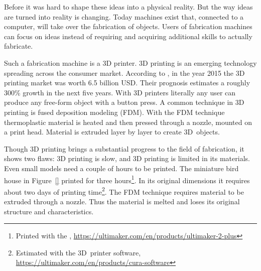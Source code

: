 \documentclass[../ClassicThesis.tex]{subfiles}
\begin{document}
Before it was hard to shape these ideas into a physical reality. But
the way ideas are turned into reality is changing. Today machines
exist that, connected to a computer, will take over the fabrication of
objects. Users of fabrication machines can focus on ideas
instead of requiring and acquiring additional skills to actually
fabricate.


Such a fabrication machine is a 3D printer. 3D printing is an emerging
technology spreading across the consumer market. According to
, in the year 2015 the 3D printing market was
worth 6.5 billion USD. Their prognosis estimates a roughly 300\%
growth in the next five years\cite{wohlers-market}. With 3D printers
literally any user can produce any free-form object with a button
press. A common technique in 3D printing is fused deposition modeling
(FDM)\cite{}. With the FDM technique
thermoplastic material is heated and then pressed through a nozzle,
mounted on a print head. Material is extruded layer by layer  to
create 3D~objects\cite{}.

Though 3D printing brings a substantial progress to the field of
fabrication, it shows two flaws: 3D printing is slow, and 3D printing
is limited in its materials. Even small models need a couple of hours
to be printed. The miniature bird house in Figure~\ref{}
printed for three hours\footnote{Printed with the ,
  \url{https://ultimaker.com/en/products/ultimaker-2-plus}}. In its
original dimensions it requires about two days of printing
time\footnote{Estimated with the  3D~printer software,
  \url{https://ultimaker.com/en/products/cura-software}}. The FDM
technique requires material to be extruded through a nozzle. Thus the
material is melted and loses its original structure and
characteristics.


\end{document}
